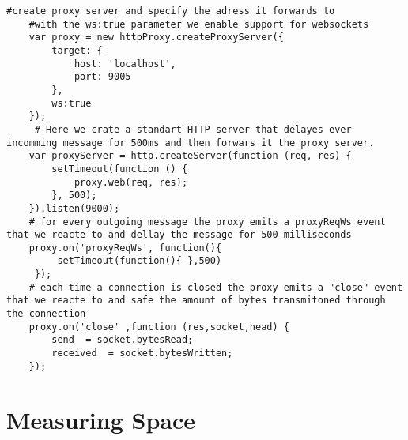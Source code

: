  \begin{lstlisting}[caption={Setting up a proxy that simulates latency with node-http-proxy}]
	#create proxy server and specify the adress it forwards to
	#with the ws:true parameter we enable support for websockets
 	var proxy = new httpProxy.createProxyServer({
 		target: {
 			host: 'localhost',
 			port: 9005
 		},
 		ws:true 
 	});
 	 # Here we crate a standart HTTP server that delayes ever incomming message for 500ms and then forwars it the proxy server.
 	var proxyServer = http.createServer(function (req, res) {
 		setTimeout(function () {
 			proxy.web(req, res);
 		}, 500);
 	}).listen(9000);
 	# for every outgoing message the proxy emits a proxyReqWs event that we reacte to and dellay the message for 500 milliseconds
 	proxy.on('proxyReqWs', function(){
 		 setTimeout(function(){ },500) 
 	 });
  	# each time a connection is closed the proxy emits a "close" event that we reacte to and safe the amount of bytes transmitoned through the connection
 	proxy.on('close' ,function (res,socket,head) { 
 		send  = socket.bytesRead;
 		received  = socket.bytesWritten;
 	});
 \end{lstlisting}

\section{Measuring Space}

 